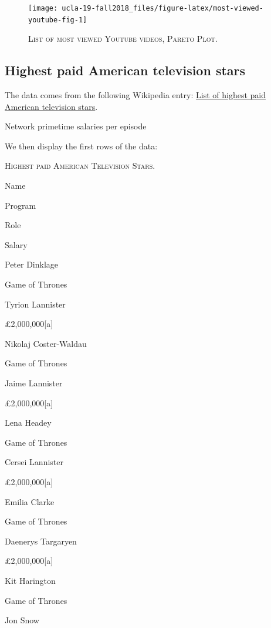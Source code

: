\documentclass[]{book}
\theoremstyle{definition}
\theoremstyle{definition}
\theoremstyle{definition}
\theoremstyle{remark}
\begin{document}
\begin{figure}

{\centering \texttt{[image: ucla-19-fall2018\_files/figure-latex/most-viewed-youtube-fig-1]} 

}

\caption{\textsc{List of most viewed Youtube
videos, Pareto Plot.}}\label{fig:most-viewed-youtube-fig}
\end{figure}

\subsection{Highest paid American television
stars}\label{highest-paid-american-television-stars}

The data comes from the following Wikipedia entry:
\href{https://en.wikipedia.org/wiki/List_of_highest_paid_American_television_stars}{List
of highest paid American television stars}.

Network primetime salaries per episode




We then display the first rows of the data:

\label{tab:highest-paid-US-tv-stars}\textsc{Highest paid American Television
Stars.}

Name

Program

Role

Salary

Peter Dinklage

Game of Thrones

Tyrion Lannister

£2,000,000{[}a{]}

Nikolaj Coster-Waldau

Game of Thrones

Jaime Lannister

£2,000,000{[}a{]}

Lena Headey

Game of Thrones

Cersei Lannister

£2,000,000{[}a{]}

Emilia Clarke

Game of Thrones

Daenerys Targaryen

£2,000,000{[}a{]}

Kit Harington

Game of Thrones

Jon Snow
\end{document}

